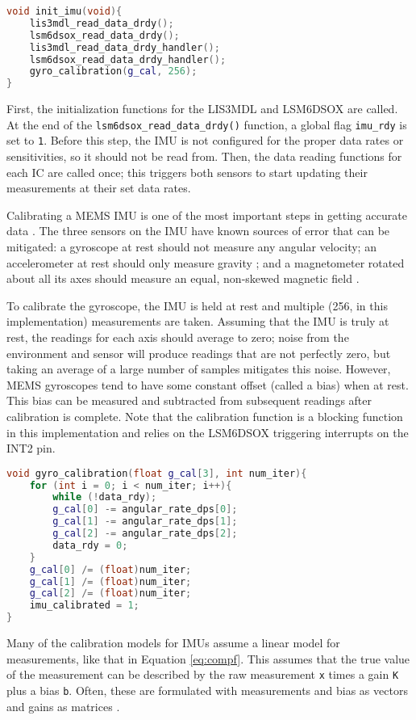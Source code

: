 \documentclass[12pt,a4paper]{report}
\begin{document}
\begin{lstlisting}[language=C++]
void init_imu(void){
	lis3mdl_read_data_drdy();
	lsm6dsox_read_data_drdy();
	lis3mdl_read_data_drdy_handler();
	lsm6dsox_read_data_drdy_handler();
	gyro_calibration(g_cal, 256);
}
\end{lstlisting}

First, the initialization functions for the LIS3MDL and LSM6DSOX are called. At the end of the \verb|lsm6dsox_read_data_drdy()| function, a global flag \verb|imu_rdy| is set to \verb|1|. Before this step, the IMU is not configured for the proper data rates or sensitivities, so it should not be read from. Then, the data reading functions for each IC are called once; this triggers both sensors to start updating their measurements at their set data rates.

Calibrating a MEMS IMU is one of the most important steps in getting accurate data \cite{imuadvnav}. The three sensors on the IMU have known sources of error that can be mitigated: a gyroscope at rest should not measure any angular velocity; an accelerometer at rest should only measure gravity \cite{imucal}; and a magnetometer rotated about all its axes should measure an equal, non-skewed magnetic field \cite{magcal}.

To calibrate the gyroscope, the IMU is held at rest and multiple (256, in this implementation) measurements are taken. Assuming that the IMU is truly at rest, the readings for each axis should average to zero; noise from the environment and sensor will produce readings that are not perfectly zero, but taking an average of a large number of samples mitigates this noise. However, MEMS gyroscopes tend to have some constant offset (called a bias) when at rest. This bias can be measured and subtracted from subsequent readings after calibration is complete. Note that the calibration function is a blocking function in this implementation and relies on the LSM6DSOX triggering interrupts on the INT2 pin.

\begin{lstlisting}[language=C++]
void gyro_calibration(float g_cal[3], int num_iter){
	for (int i = 0; i < num_iter; i++){
		while (!data_rdy);
		g_cal[0] -= angular_rate_dps[0];
		g_cal[1] -= angular_rate_dps[1];
		g_cal[2] -= angular_rate_dps[2];
		data_rdy = 0;
	}
	g_cal[0] /= (float)num_iter;
	g_cal[1] /= (float)num_iter;
	g_cal[2] /= (float)num_iter;
	imu_calibrated = 1;
}
\end{lstlisting}

Many of the calibration models for IMUs assume a linear model for measurements, like that in Equation \ref{eq:compf}. This assumes that the true value of the measurement can be described by the raw measurement \verb|x| times a gain \verb|K| plus a bias \verb|b|. Often, these are formulated with measurements and bias as vectors and gains as matrices \cite{imucal}.
\end{document}

